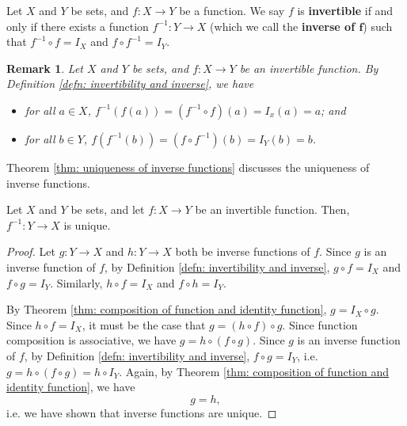 \documentclass[]{book}
\newcommand{\inv}[1]{\ensuremath{{#1}^{-1}}}
\newtheorem*{remark}{Remark}
\begin{document}
\begin{definition}
    \label{defn: invertibility and inverse}
    Let $X$ and $Y$ be sets, and $f:X \to Y$ be a function. We say $f$ is \textbf{invertible} if and only if there exists a function $\inv{f}: Y \to X$ (which we call the \textbf{inverse of $\pmb{f}$}) such that $\inv{f} \circ f = I_X$ and $f \circ \inv{f} = I_Y$.
\end{definition}

\begin{remark}
    Let $X$ and $Y$ be sets, and $f:X \to Y$ be an invertible function. By Definition \ref{defn: invertibility and inverse}, we have
    \begin{itemize}
        \item for all $a \in X$, $\inv{f} \left(f\left(a\right)\right) = \left(\inv{f} \circ f\right)(a) = I_x(a) = a$; and
        \item for all $b \in Y$, $f \left(\inv{f}\left(b\right)\right) = \left(f \circ \inv{f}\right)(b) = I_Y(b) = b$.
    \end{itemize}
\end{remark}

Theorem \ref{thm: uniqueness of inverse functions} discusses the uniqueness of inverse functions.
\begin{theorem}
    \label{thm: uniqueness of inverse functions}
    Let $X$ and $Y$ be sets, and let $f:X \to Y$ be an invertible function. Then, $\inv{f}:Y \to X$ is unique.
\begin{proof}
    Let $g:Y \to X$ and $h: Y \to X$ both be inverse functions of $f$. Since $g$ is an inverse function of $f$, by Definition \ref{defn: invertibility and inverse}, $g \circ f = I_X$ and $f \circ g = I_Y$. Similarly, $h \circ f = I_X$ and $f \circ h = I_Y$.
    
    By Theorem \ref{thm: composition of function and identity function}, $g = I_X \circ g$. Since $h \circ f = I_X$, it must be the case that $g = (h \circ f) \circ g$. Since function composition is associative, we have $g = h \circ (f \circ g)$. Since $g$ is an inverse function of $f$, by Definition \ref{defn: invertibility and inverse}, $f \circ g = I_Y$, i.e. $g = h \circ (f \circ g) = h \circ I_Y$. Again, by Theorem \ref{thm: composition of function and identity function}, we have
    \[g=h,\]
    i.e. we have shown that inverse functions are unique.
\end{proof}
\end{theorem}
\end{document}
